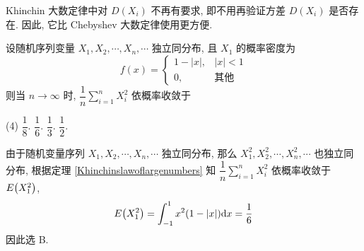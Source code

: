 Khinchin 大数定律中对 $ D\left(X_{i}\right) $ 不再有要求, 即不用再验证方差 $ D\left(X_{i}\right) $ 是否存在.
因此, 它比 Chebyshev 大数定律使用更方便.

\begin{example}
    设随机序列变量 $X_1, X_2, \cdots ,X_n, \cdots $ 独立同分布, 且 $X_1$ 的概率密度为 $$f(x)=\begin{cases}
            1-|x|, & |x|<1 \\ 0,&\text{其他}
        \end{cases}$$ 则当 $n\to \infty$ 时, $\displaystyle \dfrac{1}{n}\sum_{i=1}^{n} X_i^2$ 依概率收敛于
    \begin{tasks}(4)
        \task $\dfrac{1}{8}$.
        \task $\dfrac{1}{6}$.
        \task $\dfrac{1}{3}$.
        \task $\dfrac{1}{2}$.
    \end{tasks}
\end{example}
\begin{solution}
    由于随机变量序列  $X_1, X_2, \cdots ,X_n, \cdots $ 独立同分布, 那么  $X_1^2, X_2^2, \cdots ,X_n^2, \cdots $ 也独立同分布,
    根据定理 \ref{Khinchinslawoflargenumbers} 知 $\displaystyle \dfrac{1}{n}\sum_{i=1}^{n} X_i^2$ 依概率收敛于 $E\qty(X_1^2)$,
    $$
        E\qty(X_1^2)=\int_{-1}^{1} x^2(1-|x|) \dd x=\dfrac{1}{6}
    $$
    因此选 B.
\end{solution}